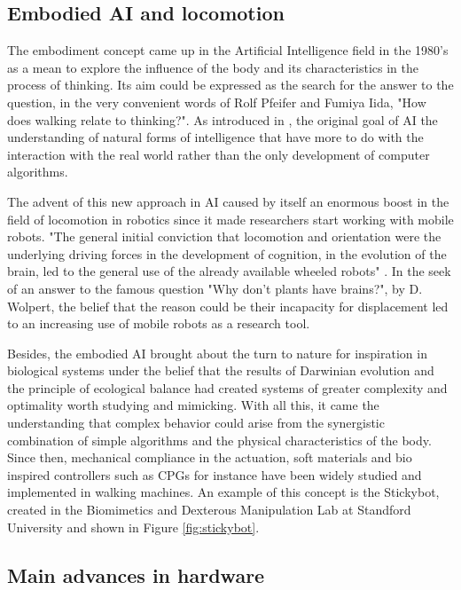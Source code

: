 \subsection{Embodied AI and locomotion} %
\label{sub:the_embodiment_}
The embodiment concept came up in the Artificial Intelligence field in the 1980's as a mean to explore the influence of the body and its characteristics in the process of thinking. 
Its aim could be expressed as the search for the answer to the question, in the very convenient words of Rolf Pfeifer and Fumiya Iida, "How does walking relate to thinking?".
As introduced in \cite{pfeifer}, the original goal of AI the understanding of natural forms of intelligence that have more to do with the interaction with the real world rather than the only development of computer algorithms.

The advent of this new approach in AI caused by itself an enormous boost in the field of locomotion in robotics since it made researchers start working with mobile robots.
"The general initial conviction that locomotion and orientation were the underlying driving forces in the development of cognition, in the evolution of the brain, led to the general use of the already available wheeled robots" \cite{pfeifer}.
In the seek of an answer to the famous question "Why don’t plants have brains?", by D. Wolpert, the belief that the reason could be their incapacity for displacement led to an increasing use of mobile robots as a research tool.

Besides, the embodied AI brought about the turn to nature for inspiration in biological systems under the belief that the results of Darwinian evolution and the principle of ecological balance had created systems of greater complexity and optimality worth studying and mimicking.
With all this, it came the understanding that complex behavior could arise from the synergistic combination of simple algorithms and the physical characteristics of the body.
Since then, mechanical compliance in the actuation, soft materials and bio inspired controllers such as CPGs for instance have been widely studied and implemented in walking machines. 
An example of this concept is the Stickybot, created in the Biomimetics and Dexterous Manipulation Lab at Standford University and shown in Figure \ref{fig:stickybot}.

\subsection{Main advances in hardware} %
\label{sub:the_advances_in_hardware}



